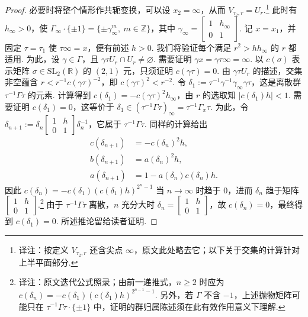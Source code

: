 \begin{proof}
必要时将整个情形作共轭变换，可以设 $x_2=\infty$，从而 $V_{\tau_2,r}=U_r$.\footnote{译注：按定义 $V_{\tau_2,r}$ 还含尖点 $\infty$，原文此处略去它；以下关于交集的计算针对上半平面部分.}
此时有 $h_\infty>0$，使 $\Gamma_\infty\cdot\{\pm1\}=\{\pm\gamma_\infty^m,\ m\in\mathbb Z\}$，其中 $\gamma_\infty=\left[\begin{smallmatrix}1&h_\infty\\0&1\end{smallmatrix}\right]$. 记 $x=x_1$，并固定 $\tau=\tau_1$ 使 $\tau\infty=x$，便有前述 $h>0$. 我们将验证每个满足 $r^2>hh_\infty$ 的 $r$ 都适用.
为此，设 $\gamma\in\Gamma$，且 $\gamma\tau U_r\cap U_r\ne\varnothing$. 需要证明 $\gamma x=\gamma\tau\infty=\infty$. 以 $c(\sigma)$ 表示矩阵 $\sigma\in\mathrm{SL}_2(\mathbb R)$ 的 $(2,1)$ 元，只须证明 $c(\gamma\tau)=0$. 由 $\gamma\tau U_r$ 的描述，交集非空蕴含 $r<r^{-1}c(\gamma\tau)^{-2}$，即 $c(\gamma\tau)^2<r^{-2}$.
令 $\delta_1:=\tau^{-1}\gamma^{-1}\gamma_\infty\gamma\tau$，这是离散群 $\tau^{-1}\Gamma\tau$ 的元素. 计算得到 $c(\delta_1)=-c(\gamma\tau)^2h_\infty$，由 $r$ 的选取知 $|c(\delta_1)h|<1$. 需要证明 $c(\delta_1)=0$，这等价于 $\delta_1\in(\tau^{-1}\Gamma\tau)_\infty=\tau^{-1}\Gamma_x\tau$.
为此，令 $\delta_{n+1}:=\delta_n\left[\begin{smallmatrix}1&h\\0&1\end{smallmatrix}\right]\delta_n^{-1}$，它属于 $\tau^{-1}\Gamma\tau$. 同样的计算给出
\begin{align*}
c(\delta_{n+1})&=-c(\delta_n)^2h,\\
b(\delta_{n+1})&=a(\delta_n)^2h,\\
a(\delta_{n+1})&=1-a(\delta_n)c(\delta_n)h.
\end{align*}
因此 $c(\delta_n)=-c(\delta_1)(c(\delta_1)h)^{2^n-1}$ 当 $n\to\infty$ 时趋于 $0$，进而 $\delta_n$ 趋于矩阵 $\left[\begin{smallmatrix}1&h\\0&1\end{smallmatrix}\right]$.\footnote{译注：原文迭代公式照录；由前一递推式，$n\ge2$ 时应为 $c(\delta_n)=-c(\delta_1)(c(\delta_1)h)^{2^{n-1}-1}$. 另外，若 $\Gamma$ 不含 $-1$，上述抛物矩阵可能只在 $\tau^{-1}\Gamma\tau\cdot\{\pm1\}$ 中，证明的群归属陈述须在此有效作用意义下理解.}
由于 $\tau^{-1}\Gamma\tau$ 离散，$n$ 充分大时 $\delta_n=\left[\begin{smallmatrix}1&h\\0&1\end{smallmatrix}\right]$，故 $c(\delta_n)=0$，最终得到 $c(\delta_1)=0$. 所述推论留给读者证明.
\end{proof}
